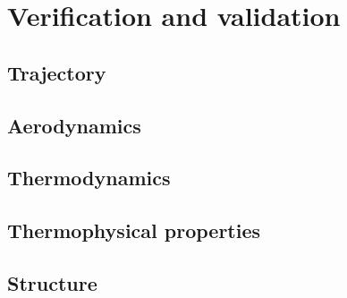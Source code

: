 \section{Verification and validation}

\subsection{Trajectory} \label{sec:VandVtraj}


\subsection{Aerodynamics} \label{sec:VandVaero}


\subsection{Thermodynamics} \label{sec:VandVthermo}


\subsection{Thermophysical properties} \label{sec:VandVthermoprop}


\subsection{Structure} \label{sec:VandVstruc}


